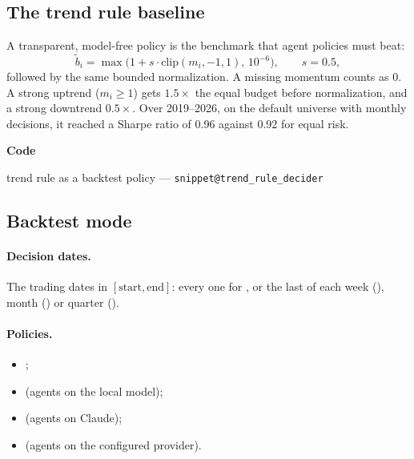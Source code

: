 \documentclass[11pt,a4paper]{article}
\makeatletter
\newcommand{\snippetsource}[1]{\csname snippet@#1\endcsname}
\newcommand{\snippet}[3]{%
  }
\newenvironment{codepointers}{%
  \par\smallskip\begingroup\footnotesize\noindent\textcolor{blue!50!black}{\textbf{Code}}\par\nopagebreak
  \begin{list}{}{\setlength{\leftmargin}{1.2em}\setlength{\itemsep}{0pt}\setlength{\parsep}{0pt}\setlength{\topsep}{1pt}}}%
  {\end{list}\endgroup\smallskip}
\newcommand{\codeitem}[2]{\item #2 --- \texttt{\snippetsource{#1}}}
\makeatother
\begin{document}
\subsection{The trend rule baseline}
A transparent, model-free policy is the benchmark that agent policies must beat:
\[
  \tilde b_i=\max\!\big(1+s\cdot\mathrm{clip}(m_i,-1,1),\,10^{-6}\big),\qquad s=0.5,
\]
followed by the same bounded normalization. A missing momentum counts as 0. A strong
uptrend ($m_i\ge1$) gets $1.5\times$ the equal budget before normalization, and a strong
downtrend $0.5\times$. Over 2019--2026, on the default universe with monthly decisions, it
reached a Sharpe ratio of 0.96 against 0.92 for equal risk.
\snippet{trend_tilted_budgets}{Python}{The trend rule}
\begin{codepointers}
  \codeitem{trend_rule_decider}{trend rule as a backtest policy}
\end{codepointers}

\subsection{Backtest mode}\label{sec:backtest-mode}
\paragraph{Decision dates.} The trading dates in $[\text{start},\text{end}]$: every one for
, or the last of each week (), month () or quarter ().

\paragraph{Policies.}
\begin{itemize}
  \item {};
  \item {} (agents on the local model);
  \item {} (agents on Claude);
  \item {} (agents on the configured provider).
\end{itemize}
\end{document}
